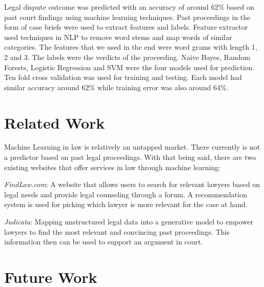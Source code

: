 \documentclass[journal]{IEEEtran}
\begin{document}
Legal dispute outcome was predicted with an accuracy of around 62\% based on past court findings using machine learning techniques. Past proceedings in the form of case briefs were used to extract features and labels. Feature extractor used techniques in NLP to remove word stems and map words of similar categories. The features that we used in the end were word grams with length 1, 2 and 3. The labels were the verdicts of the proceeding. Naive Bayes, Random Forests, Logistic Regression and SVM were the four models used for prediction. Ten fold cross validation was used for training and testing. Each model had similar accuracy around 62\% while training error was also around 64\%. 

\section{Related Work}

Machine Learning in law is relatively an untapped market. There currently is not a predictor based on past legal proceedings. With that being said, there are two existing websites that offer services in law through machine learning:

\textit{FindLaw.com}: A website that allows users to search for relevant lawyers based on legal needs and  provide legal counseling through a forum. A recommendation system is used for picking which lawyer is more relevant for the case at hand.

\textit{Judicata}: Mapping unstructured legal data into a generative model to empower lawyers to find the most relevant and convincing past proceedings. This information then can be used to support an argument in court.


\section{Future Work}





\end{document}
